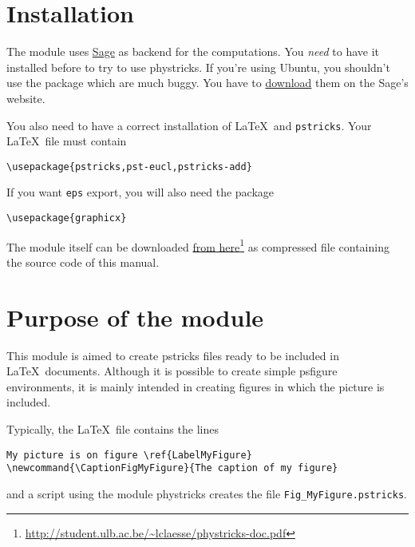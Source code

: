 \section{Installation}

The module uses \href{http://sagemath.org}{Sage} as backend for the computations. You \emph{need} to have it installed before to try to use phystricks. If you're using Ubuntu, you shouldn't use the package which are much buggy. You have to \href{http://www.sagemath.fr/linux/32bit/index.html}{download} them on the Sage's website.

You also need to have a correct installation of \LaTeX\ and \verb+pstricks+. Your \LaTeX\ file must contain
\begin{verbatim}
\usepackage{pstricks,pst-eucl,pstricks-add}
\end{verbatim}
If you want \verb+eps+ export, you will also need the package 
\begin{verbatim}
\usepackage{graphicx}
\end{verbatim}

The module itself can be downloaded \href{http://student.ulb.ac.be/~lclaesse/}{from here}\footnote{\url{http://student.ulb.ac.be/~lclaesse/phystricks-doc.pdf}} as compressed file containing the source code of this manual.

\section{Purpose of the module}

This module is aimed to create pstricks files ready to be included in \LaTeX\ documents. Although it is possible to create simple psfigure environments, it is mainly intended in creating figures in which the picture is included.

Typically, the \LaTeX\ file contains the lines
\begin{verbatim}
My picture is on figure \ref{LabelMyFigure}
\newcommand{\CaptionFigMyFigure}{The caption of my figure}

\end{verbatim}
and a script using the module phystricks creates the file \verb+Fig_MyFigure.pstricks+.


